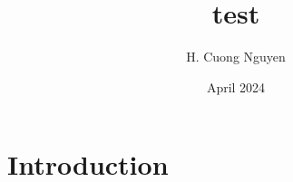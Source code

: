 \documentclass{article}
\title{test}
\author{H. Cuong Nguyen}
\date{April 2024}
\begin{document}
\maketitle

\section{Introduction}
\end{document}
